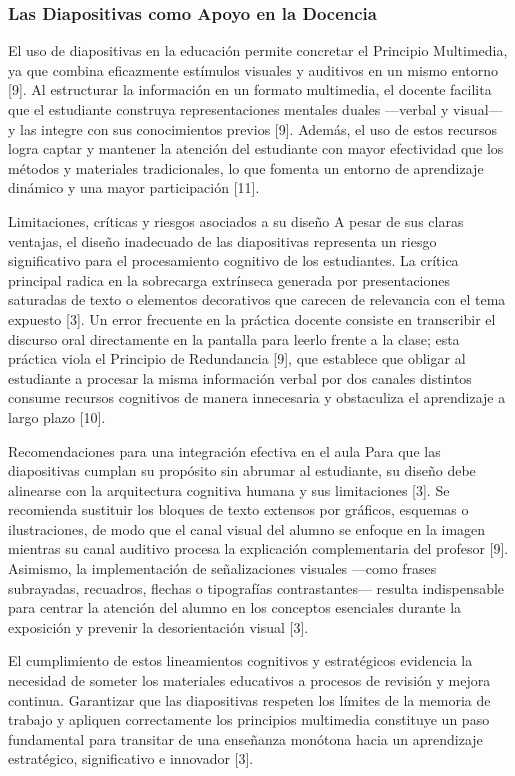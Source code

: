 \documentclass[11pt]{article}
\begin{document}
\subsubsection*{Las Diapositivas como Apoyo en la Docencia}
El uso de diapositivas en la educación permite concretar el Principio Multimedia, ya que combina eficazmente estímulos visuales y auditivos en un mismo entorno [9]. Al estructurar la información en un formato multimedia, el docente facilita que el estudiante construya representaciones mentales duales —verbal y visual— y las integre con sus conocimientos previos [9]. Además, el uso de estos recursos logra captar y mantener la atención del estudiante con mayor efectividad que los métodos y materiales tradicionales, lo que fomenta un entorno de aprendizaje dinámico y una mayor participación [11].

Limitaciones, críticas y riesgos asociados a su diseño
A pesar de sus claras ventajas, el diseño inadecuado de las diapositivas representa un riesgo significativo para el procesamiento cognitivo de los estudiantes. La crítica principal radica en la sobrecarga extrínseca generada por presentaciones saturadas de texto o elementos decorativos que carecen de relevancia con el tema expuesto [3]. Un error frecuente en la práctica docente consiste en transcribir el discurso oral directamente en la pantalla para leerlo frente a la clase; esta práctica viola el Principio de Redundancia [9], que establece que obligar al estudiante a procesar la misma información verbal por dos canales distintos consume recursos cognitivos de manera innecesaria y obstaculiza el aprendizaje a largo plazo [10].

Recomendaciones para una integración efectiva en el aula
Para que las diapositivas cumplan su propósito sin abrumar al estudiante, su diseño debe alinearse con la arquitectura cognitiva humana y sus limitaciones [3]. Se recomienda sustituir los bloques de texto extensos por gráficos, esquemas o ilustraciones, de modo que el canal visual del alumno se enfoque en la imagen mientras su canal auditivo procesa la explicación complementaria del profesor [9]. Asimismo, la implementación de señalizaciones visuales —como frases subrayadas, recuadros, flechas o tipografías contrastantes— resulta indispensable para centrar la atención del alumno en los conceptos esenciales durante la exposición y prevenir la desorientación visual [3].

El cumplimiento de estos lineamientos cognitivos y estratégicos evidencia la necesidad de someter los materiales educativos a procesos de revisión y mejora continua. Garantizar que las diapositivas respeten los límites de la memoria de trabajo y apliquen correctamente los principios multimedia constituye un paso fundamental para transitar de una enseñanza monótona hacia un aprendizaje estratégico, significativo e innovador [3].
\end{document}
